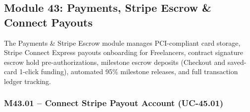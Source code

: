 
\newpage
\subsection{Module 43: Payments, Stripe Escrow \& Connect Payouts}

The Payments \& Stripe Escrow module manages PCI-compliant card storage, Stripe Connect Express payouts onboarding for Freelancers, contract signature escrow hold pre-authorizations, milestone escrow deposits (Checkout and saved-card 1-click funding), automated 95\% milestone releases, and full transaction ledger tracking.

\subsubsection{M43.01 -- Connect Stripe Payout Account (UC-45.01)}

